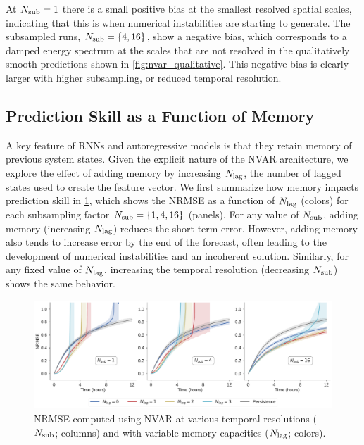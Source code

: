 At $N_\text{sub}=1$ there is a small positive bias at the smallest resolved spatial
scales, indicating that this is when numerical instabilities are starting to
generate.
The subsampled runs, $N_\text{sub}=\{4,16\}$, show a negative bias, which corresponds
to a damped energy spectrum at the scales that are not resolved in the
qualitatively smooth predictions shown in \cref{fig:nvar_qualitative}.
This negative bias is clearly larger with higher subsampling, or reduced
temporal resolution.


\subsection{Prediction Skill as a Function of Memory}
\label{subsec:nvar-memory}

A key feature of RNNs and autoregressive models is that they retain memory of
previous system states.
Given the explicit nature of the NVAR architecture, we explore the effect of
adding memory by increasing $N_\text{lag}$, the number of lagged states used to create the
feature vector.
We first summarize how memory impacts prediction skill in
\cref{fig:nvar_nrmse_vs_lag}, which shows the NRMSE as a
function of $N_\text{lag}$ (colors) for each
subsampling factor $N_\text{sub} = \{1, 4, 16\}$ (panels).
For any value of $N_\text{sub}$, adding memory (increasing $N_\text{lag}$) reduces
the short term error.
However, adding memory also tends to increase error by the end of the forecast,
often leading to the development of numerical instabilities and an
incoherent solution.
Similarly, for any fixed value of $N_\text{lag}$, increasing the temporal resolution
(decreasing $N_\text{sub}$) shows the same behavior.

\begin{figure}
    \centering
    \includegraphics[width=\textwidth]{../figures/nvar_nrmse_vs_memory.pdf}
    \caption{NRMSE computed using NVAR at various temporal resolutions
        ($N_\text{sub}$; columns) and with variable memory capacities ($N_\text{lag}$;
        colors).
    }
    \label{fig:nvar_nrmse_vs_lag}
\end{figure}

